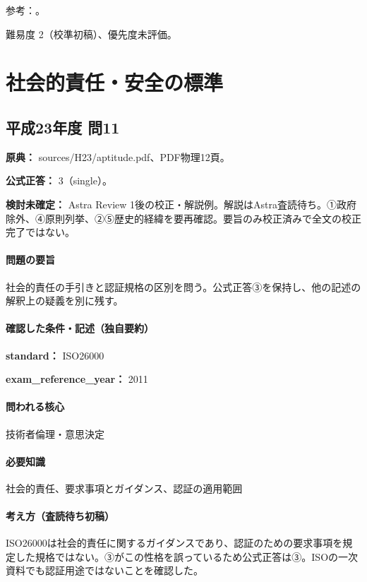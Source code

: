 \par 参考：\cite{cabinet_npo_overview,cabinet_npo_officers}。

\par 難易度 2（校準初稿）、優先度未評価。

\section{社会的責任・安全の標準}

\subsection{平成23年度 問11}
\label{q:h23-reg-apt-11}

\noindent\textbf{原典：} sources/H23/aptitude.pdf、PDF物理12頁。

\textbf{公式正答：} 3（single）。

\par\textbf{検討未確定：} Astra Review 1後の校正・解説例。解説はAstra査読待ち。①政府除外、④原則列挙、②⑤歴史的経緯を要再確認。要旨のみ校正済みで全文の校正完了ではない。

\paragraph{問題の要旨} 社会的責任の手引きと認証規格の区別を問う。公式正答③を保持し、他の記述の解釈上の疑義を別に残す。

\paragraph{確認した条件・記述（独自要約）}\mbox{}\par

\noindent\textbf{standard：} ISO26000\par

\noindent\textbf{exam\_reference\_year：} 2011\par

\paragraph{問われる核心} 技術者倫理・意思決定

\paragraph{必要知識} 社会的責任、要求事項とガイダンス、認証の適用範囲

\paragraph{考え方（査読待ち初稿）} ISO26000は社会的責任に関するガイダンスであり、認証のための要求事項を規定した規格ではない。③がこの性格を誤っているため公式正答は③。ISOの一次資料でも認証用途ではないことを確認した。

